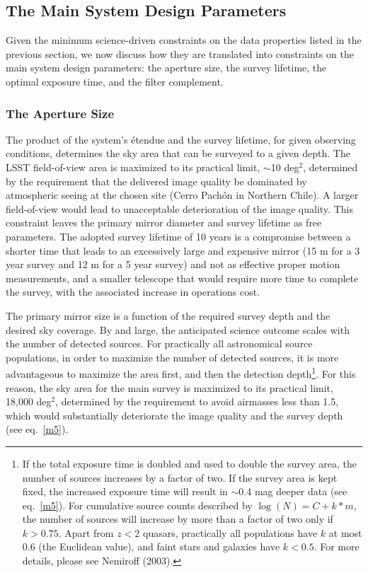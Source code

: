 \documentclass{emulateapj}
\begin{document}
\subsection{The Main System Design Parameters} 

Given the minimum science-driven constraints on the data properties listed 
in the previous section, we now discuss how they are translated into
constraints on the main system design parameters: the aperture size, 
the survey lifetime, the optimal exposure time, and the filter complement. 


\subsubsection{ The Aperture Size }
\label{Sec:apSize}
The product of the system's \'etendue and the survey lifetime, for given
observing conditions, determines
the sky area that can be surveyed to a given depth. 
The 
LSST field-of-view area is maximized to its practical limit, $\sim$10 deg$^2$, 
determined by the requirement that the delivered image quality be dominated 
by atmospheric seeing at the chosen site (Cerro Pach\'{o}n in Northern Chile). 
A larger field-of-view would lead to unacceptable deterioration of the 
image quality. This constraint leaves the primary mirror diameter and survey lifetime 
as free parameters. The adopted survey lifetime of 10 years is a compromise 
between a shorter time that leads to an excessively large and expensive mirror (15 m for a 
3 year survey and 12 m for a 5 year survey) and not as effective proper motion
measurements, and a smaller telescope that would require more time to complete the 
survey, with the associated increase in operations cost.

The primary mirror size is a function of the required survey depth and the 
desired sky coverage. By and large, the anticipated science outcome scales 
with the number of detected sources. For practically all astronomical source 
populations, in order to maximize the number of detected sources, it is more 
advantageous to maximize the area first, and then 
the detection depth\footnote{ 
If the total exposure time is doubled and used to double the survey area, 
the number of sources increases by a factor of two. If the survey 
area is kept fixed, the increased exposure time will result in 
$\sim$0.4 mag deeper data (see eq.~\ref{m5}). For cumulative source 
counts described by $\log(N) = C + k*m$, the number of sources
will increase by more than a factor of two only if $k>0.75$. 
Apart from $z<2$ quasars, practically all populations 
have $k$ at most 0.6 (the Euclidean value), and faint stars 
and galaxies have $k<0.5$. For more details, please see Nemiroff
(2003).}. For this reason, the sky area for the main survey is 
maximized to its practical limit, 18,000 deg$^2$, determined by the 
requirement to avoid airmasses less than 1.5, 
which would substantially 
deteriorate the image quality and the survey depth (see eq.~\ref{m5}). 
\end{document}
